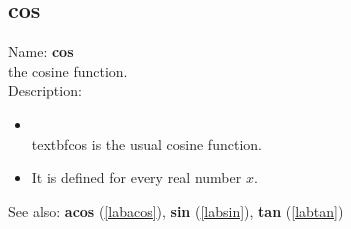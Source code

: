 \subsection{cos}
\label{labcos}
\noindent Name: \textbf{cos}\\
the cosine function.\\
\noindent Description: \begin{itemize}

\item \\textbf{cos} is the usual cosine function.\n
\item It is defined for every real number $x$.\n\end{itemize}
See also: \textbf{acos} (\ref{labacos}), \textbf{sin} (\ref{labsin}), \textbf{tan} (\ref{labtan})
